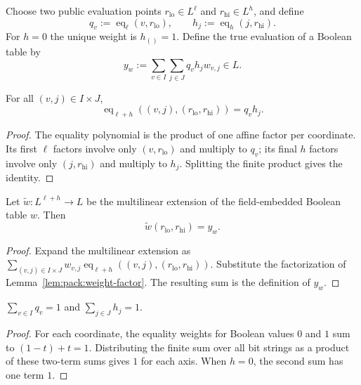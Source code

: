 \begin{definition}\label{def:pack:weights}
Choose two public evaluation points
$r_{\mathrm{lo}}\in L^\ell$ and
$r_{\mathrm{hi}}\in L^h$, and define
\[
 q_v:=\operatorname{eq}_\ell(v,r_{\mathrm{lo}}),
 \qquad
 h_j:=\operatorname{eq}_h(j,r_{\mathrm{hi}}).
\]
For $h=0$ the unique weight is $h_{()}=1$.
Define the true evaluation of a Boolean table by
\[
 y_w:=\sum_{v\in I}\sum_{j\in J}
             q_vh_jw_{v,j}\in L.
\]
\end{definition}

\begin{lemma}\label{lem:pack:weight-factor}
For all $(v,j)\in I\times J$,
\[
 \operatorname{eq}_{\ell+h}
 ((v,j),(r_{\mathrm{lo}},r_{\mathrm{hi}}))
 =q_vh_j.
\]
\end{lemma}
\begin{proof}
The equality polynomial is the product of one
affine factor per coordinate. Its first $\ell$
factors involve only $(v,r_{\mathrm{lo}})$ and
multiply to $q_v$; its final $h$ factors involve
only $(j,r_{\mathrm{hi}})$ and multiply to $h_j$.
Splitting the finite product gives the identity.
\end{proof}

\begin{corollary}\label{cor:pack:original-evaluation}
Let $\widetilde w:L^{\ell+h}\to L$ be the
multilinear extension of the field-embedded
Boolean table $w$. Then
\[
 \boxed{\widetilde w(r_{\mathrm{lo}},r_{\mathrm{hi}})
 =y_w.}
\]
\end{corollary}
\begin{proof}
Expand the multilinear extension as
$\sum_{(v,j)\in I\times J}
  w_{v,j}\operatorname{eq}_{\ell+h}
      ((v,j),(r_{\mathrm{lo}},r_{\mathrm{hi}}))$.
Substitute the factorization of
Lemma~\ref{lem:pack:weight-factor}.
The resulting sum is the definition of $y_w$.
\end{proof}

\begin{lemma}\label{lem:pack:weight-sum}
$\sum_{v\in I}q_v=1$ and $\sum_{j\in J}h_j=1$.
\end{lemma}
\begin{proof}
For each coordinate, the equality weights
for Boolean values $0$ and $1$ sum to
$(1-t)+t=1$. Distributing the finite sum
over all bit strings as a product of these
two-term sums gives $1$ for each axis.
When $h=0$, the second sum has one term $1$.
\end{proof}
